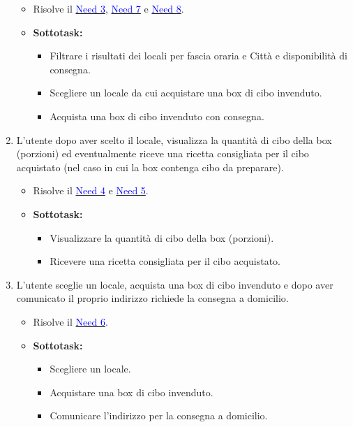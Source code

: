 \documentclass{article}
\begin{document}
\begin{enumerate}[label=\textbf{Task-\arabic*}]
    \begin{itemize}
        \item Risolve il \hyperref[need3]{\textcolor{blue}{Need 3}}, \hyperref[need7]{\textcolor{blue}{Need 7}} e \hyperref[need8]{\textcolor{blue}{Need 8}}.
        \item \textbf{Sottotask:} 
        \begin{itemize}
            \item Filtrare i risultati dei locali per fascia oraria e Città e disponibilità di consegna.
            \item Scegliere un locale da cui acquistare una box di cibo invenduto.
            \item Acquista una box di cibo invenduto con consegna.
        \end{itemize}
    \end{itemize}
    \item L'utente dopo aver scelto il locale, visualizza la quantità di cibo della box (porzioni) ed eventualmente riceve una ricetta consigliata per il cibo acquistato (nel caso in cui la box contenga cibo da preparare).
    \begin{itemize}
        \item Risolve il \hyperref[need4]{\textcolor{blue}{Need 4}} e \hyperref[need5]{\textcolor{blue}{Need 5}}.
        \item \textbf{Sottotask:} 
        \begin{itemize}
            \item Visualizzare la quantità di cibo della box (porzioni).
            \item Ricevere una ricetta consigliata per il cibo acquistato.
        \end{itemize}
    \end{itemize}
    \item L'utente sceglie un locale, acquista una box di cibo invenduto e dopo aver comunicato il proprio indirizzo richiede la consegna a domicilio.
    \begin{itemize}
        \item Risolve il \hyperref[need6]{\textcolor{blue}{Need 6}}.
        \item \textbf{Sottotask:} 
        \begin{itemize}
            \item Scegliere un locale.
            \item Acquistare una box di cibo invenduto.
            \item Comunicare l'indirizzo per la consegna a domicilio.

\end{itemize}
\end{itemize}
\end{enumerate}
\end{document}
